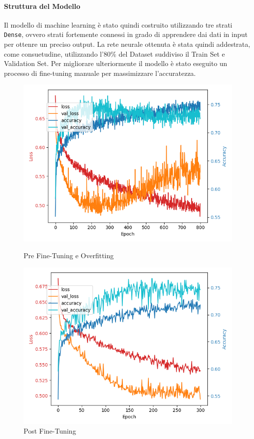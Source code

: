 \paragraph{Struttura del Modello}
Il modello di machine learning è stato quindi costruito utilizzando tre strati \texttt{Dense}, ovvero strati fortemente connessi in grado di apprendere dai dati in input per ottenre un preciso output. La rete neurale ottenuta è stata quindi addestrata, come consuetudine, utilizzando l'80\% del Dataset suddiviso il Train Set e Validation Set.
Per migliorare ulteriormente il modello è stato eseguito un processo di fine-tuning manuale per massimizzare l'accuratezza.

\begin{figure}[H]
    \centering
    \begin{minipage}[b]{0.45\linewidth}
        \centering
        \includegraphics[width=\linewidth]{img/final800.png}
        \caption{Pre Fine-Tuning e Overfitting}
        \label{fig:first_label}
    \end{minipage}
    \hspace{0.05\linewidth}
    \begin{minipage}[b]{0.45\linewidth}
        \centering
        \includegraphics[width=\linewidth]{img/final_mlp.png}
        \caption{Post Fine-Tuning}
        \label{fig:second_label}
    \end{minipage}
\end{figure}

